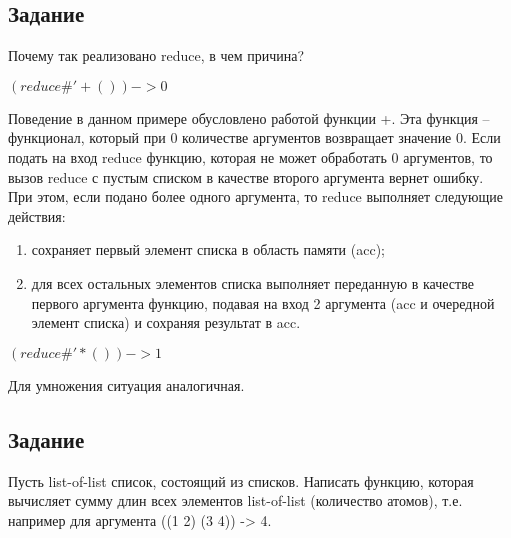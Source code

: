 \subsection{Задание }

Почему так реализовано reduce, в чем причина?

$(reduce \#'+ ()) -> 0$

Поведение в данном примере обусловлено работой функции +. Эта функция -- функционал, который при 0 количестве аргументов возвращает значение 0. Если подать на вход reduce функцию, которая не может обработать 0 аргументов, то вызов reduce с пустым списком в качестве второго аргумента вернет ошибку. При этом, если подано более одного аргумента, то reduce выполняет следующие действия:

\begin{enumerate}[label=---]
	\item сохраняет первый элемент списка в область памяти (acc);
	\item  для всех остальных элементов списка выполняет переданную в качестве первого аргумента функцию, подавая на вход 2 аргумента (acc и очередной элемент списка) и сохраняя результат в acc.
\end{enumerate}

$(reduce \#'* ()) -> 1$

Для умножения ситуация аналогичная.

\subsection{Задание }

Пусть list-of-list список, состоящий из списков. Написать функцию, которая вычисляет сумму длин всех элементов list-of-list (количество атомов), т.е. например для аргумента ((1 2) (3 4)) -> 4.


